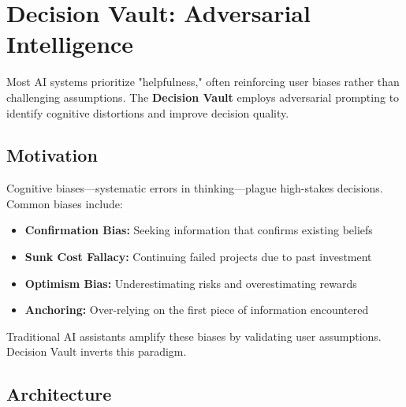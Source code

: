 \documentclass[conference]{IEEEtran}
\begin{document}
\section{Decision Vault: Adversarial Intelligence}

Most AI systems prioritize "helpfulness," often reinforcing user biases rather than challenging assumptions. The \textbf{Decision Vault} employs adversarial prompting to identify cognitive distortions and improve decision quality.

\subsection{Motivation}

Cognitive biases—systematic errors in thinking—plague high-stakes decisions. Common biases include:
\begin{itemize}
    \item \textbf{Confirmation Bias:} Seeking information that confirms existing beliefs
    \item \textbf{Sunk Cost Fallacy:} Continuing failed projects due to past investment
    \item \textbf{Optimism Bias:} Underestimating risks and overestimating rewards
    \item \textbf{Anchoring:} Over-relying on the first piece of information encountered
\end{itemize}

Traditional AI assistants amplify these biases by validating user assumptions. Decision Vault inverts this paradigm.

\subsection{Architecture}
\end{document}
